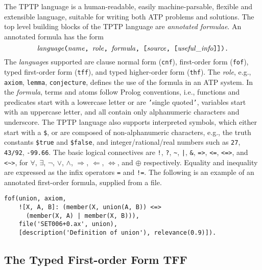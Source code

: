 The TPTP language is a human-readable, easily machine-parsable, flexible and
extensible language, suitable for writing both ATP problems and solutions.
The top level building blocks of the TPTP language are {\em annotated 
formulae}.
An annotated formula has the form $$\mathit{language}\text{\tt(}\mathit{name}\text{\tt, }\mathit{role}\text{\tt, }\mathit{formula}\text{\tt, [}\mathit{source}\text{\tt, [}\mathit{useful\_info}\text{\tt]]).}$$
The {\em language}s supported are clause normal form (\lstinline'cnf'),
first-order form (\lstinline'fof'), typed first-order form (\lstinline'tff'), and
typed higher-order form (\lstinline'thf').
The {\em role}, e.g., \lstinline'axiom', \lstinline'lemma', \lstinline'conjecture',
defines the use of the formula in an ATP system.
In the {\em formula}, terms and atoms follow Prolog conventions, i.e.,
functions and predicates start with a lowercase letter or are {\tt '}single
quoted{\tt '}, variables start with an uppercase letter, and all
contain only alphanumeric characters and underscore.
The TPTP language also supports interpreted symbols, which either start with a
\lstinline'$', or are composed of non-alphanumeric characters, e.g., the truth
constants \lstinline'$true' and \lstinline'$false', and integer/rational/real
numbers such as \lstinline'27', \lstinline'43/92', \lstinline'-99.66'.
The basic logical connectives are
\lstinline'!', \lstinline'?', \lstinline'~', \lstinline'|', \lstinline'&', \lstinline'=>', \lstinline'<=',
\lstinline'<=>', and \lstinline'<~>',
for
$\forall$, $\exists$, $\neg$, $\vee$, $\wedge$, $\Rightarrow$, $\Leftarrow$,
$\Leftrightarrow$, and $\oplus$ respectively.
Equality and inequality are expressed as the infix operators \lstinline'=' and
\lstinline'!='.
The following is an example of an annotated first-order formula, supplied from a file.
\begin{lstlisting}[language=tptp]
fof(union, axiom,
    ![X, A, B]: (member(X, union(A, B)) <=>
      (member(X, A) | member(X, B))),
    file('SET006+0.ax', union),
    [description('Definition of union'), relevance(0.9)]).
\end{lstlisting}

\subsection{The Typed First-order Form TFF}
\label{sec:tfx/TFF}

